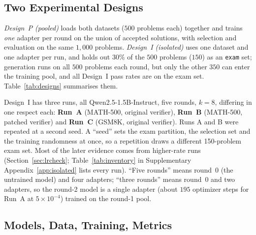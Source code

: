 \documentclass[runningheads]{llncs}
\begin{document}
\subsection{Two Experimental Designs}
\label{sec:designs}

\emph{Design~P (pooled)} loads both datasets ($500$ problems each) together and
trains \emph{one} adapter per round on the union of accepted solutions, with
selection and evaluation on the same $1{,}000$ problems. \emph{Design~I
(isolated)} uses one dataset and one adapter per run, and holds out $30\%$ of the
$500$ problems ($150$) as an \texttt{exam} set; generation runs on all $500$
problems each round, but only the other $350$ can enter the training pool, and
all Design~I pass rates are on the exam set. Table~\ref{tab:designs} summarises
them.

Design~I has three runs, all Qwen2.5-1.5B-Instruct, five rounds, $k=8$, differing
in one respect each: \textbf{Run~A} (MATH-500, original verifier), \textbf{Run~B}
(MATH-500, patched verifier) and \textbf{Run~C} (GSM8K, original verifier). Runs
A and B were repeated at a second seed. A
``seed'' sets the exam partition, the selection set and the training randomness
at once, so a repetition draws a different 150-problem exam set. Most of the
later evidence comes from higher-rate runs (Section~\ref{sec:lrcheck}; Table~\ref{tab:inventory} in Supplementary Appendix~\ref{app:isolated} lists every run). ``Five rounds'' means
round~0 (the untrained model) and four adapters; ``three rounds'' means round~0 and two adapters, so the
round-2 model is a single adapter (about $195$ optimizer steps for Run~A at
$5\times10^{-4}$) trained on the round-1 pool.

\subsection{Models, Data, Training, Metrics}
\label{sec:config}
\end{document}

